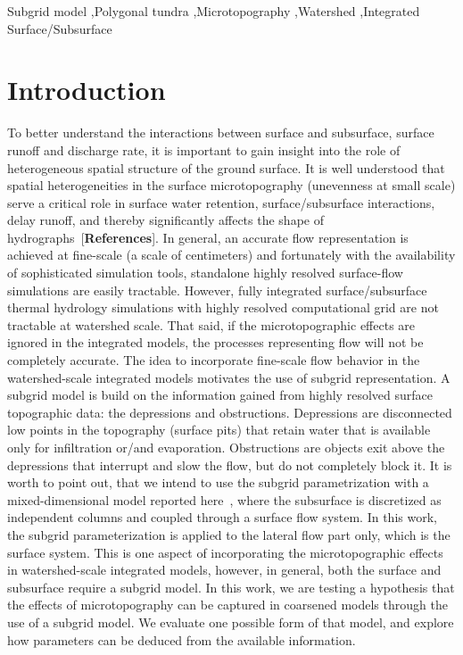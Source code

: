 \documentclass[review,11pt]{elsarticle}
\begin{document}
\begin{frontmatter}
\begin{keyword}
Subgrid model \sep Polygonal tundra \sep  Microtopography  \sep Watershed \sep Integrated Surface/Subsurface
\end{keyword}


\end{frontmatter}

\linenumbers

\FloatBarrier
\section{Introduction}\label{introduction}
To better understand the interactions between surface and subsurface, surface runoff and discharge rate, it is important to gain insight into the role of
heterogeneous spatial structure of the ground surface.
It is well understood that spatial heterogeneities in the surface microtopography (unevenness at small scale) serve a critical role in surface water retention, surface/subsurface interactions, delay runoff, and thereby significantly affects the shape of hydrographs~\cite{holden2005peatland, huang2009influences, andresen2015disappearing}[\textbf{References}]. In general, an accurate flow representation is achieved at fine-scale (a scale of centimeters) and fortunately with the availability of sophisticated simulation tools, standalone highly resolved surface-flow simulations are easily tractable. However, fully integrated surface/subsurface thermal hydrology simulations with highly resolved computational grid are not tractable at watershed scale. That said, if the microtopographic effects are ignored in the integrated models, the processes representing flow will not be completely accurate. The idea to incorporate fine-scale flow behavior in the watershed-scale integrated models motivates the use of subgrid representation. 
A subgrid model is build on the information gained from highly resolved surface topographic data: the depressions and obstructions. Depressions are disconnected low points in the topography (surface pits) that retain water that is available only for infiltration or/and evaporation. Obstructions are objects exit above the depressions that interrupt and slow the flow, but do not completely block it. It is worth to point out, that we intend to use the subgrid parametrization with a mixed-dimensional model reported here~\cite{jan2017}, where the subsurface is discretized as independent columns and coupled through a surface flow system. In this work, the subgrid parameterization is applied to the lateral flow part only, which is the surface system. This is one aspect of incorporating the microtopographic effects in watershed-scale integrated models, however, in general, both the surface and subsurface require a subgrid model. 
In this work, we are testing a hypothesis that the effects of microtopography can be captured in coarsened models through the use of a subgrid model. We evaluate one possible form of that model, and explore how parameters can be deduced from the available information.
\end{document}
